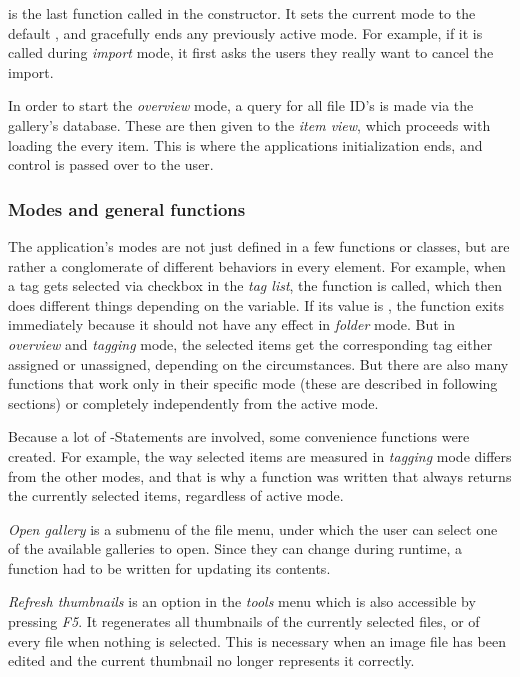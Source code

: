  is the last function called in the constructor. It sets the current mode
to the default , and gracefully ends any previously active
mode. For example, if it is called during \emph{import} mode, it first asks the users they really want to cancel the import.

In order to start the \emph{overview} mode, a query for all file ID's is made via the
gallery's database. These are then given to the \emph{item view}, which proceeds
with loading the every item. This is where the applications initialization
ends, and control is passed over to the user. 

\subsubsection{Modes and general functions}

The application's modes are not just defined in a few functions or classes, but are rather a conglomerate of 
different behaviors in every element. For example, when a tag gets selected via checkbox in the \emph{tag list}, the function  is called, which then does different things depending on the  variable. If its value is , the function exits immediately because it should not have any effect in \emph{folder} mode. But in \emph{overview} and \emph{tagging} mode, the selected items get the corresponding tag either assigned or unassigned, depending on the circumstances. But there are also many functions that work only in their specific mode (these are described in following sections) or completely independently from the active mode.

Because a lot of -Statements are involved, some convenience functions were created. For example, the way selected items are measured in \emph{tagging} mode differs from the other modes, and that is why a function was written that always returns the currently selected items, regardless of active mode.

\emph{Open gallery} is a submenu of the file menu, under which the user can
select one of the available galleries to open. Since they can change during
runtime, a function had to be written for updating its contents.

\emph{Refresh thumbnails} is an option in the \emph{tools} menu which is also accessible by pressing \emph{F5}. It regenerates all thumbnails of the currently selected files, or of every file when nothing is selected. This is necessary when an image file has been edited and the current thumbnail no longer represents it correctly.

